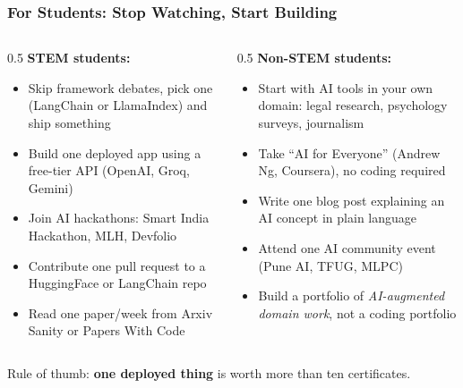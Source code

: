 \begin{frame}[fragile]\frametitle{For Students: Stop Watching, Start Building}

\begin{columns}
    \begin{column}[T]{0.5\linewidth}
\textbf{STEM students:}
\begin{itemize}
\item Skip framework debates, pick one (LangChain or LlamaIndex) and ship something
\item Build one deployed app using a free-tier API (OpenAI, Groq, Gemini)
\item Join AI hackathons: Smart India Hackathon, MLH, Devfolio
\item Contribute one pull request to a HuggingFace or LangChain repo
\item Read one paper/week from Arxiv Sanity or Papers With Code
\end{itemize}
    \end{column}
    \begin{column}[T]{0.5\linewidth}
\textbf{Non-STEM students:}
\begin{itemize}
\item Start with AI tools in your own domain: legal research, psychology surveys, journalism
\item Take ``AI for Everyone'' (Andrew Ng, Coursera), no coding required
\item Write one blog post explaining an AI concept in plain language
\item Attend one AI community event (Pune AI, TFUG, MLPC)
\item Build a portfolio of \textit{AI-augmented domain work}, not a coding portfolio
\end{itemize}
    \end{column}
\end{columns}

\vspace{0.2cm}
{\small Rule of thumb: \textbf{one deployed thing} is worth more than ten certificates.}

\end{frame}


